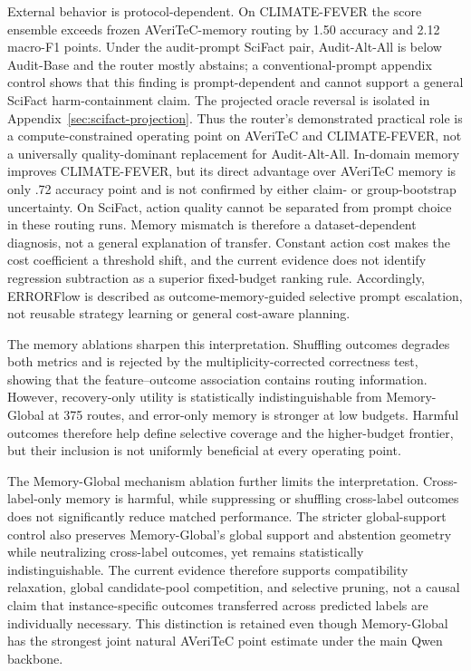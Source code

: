 \documentclass[runningheads]{llncs}
\begin{document}
External behavior is protocol-dependent. On CLIMATE-FEVER the score ensemble
exceeds frozen AVeriTeC-memory routing by 1.50 accuracy and 2.12 macro-F1
points. Under the audit-prompt SciFact pair, Audit-Alt-All is below Audit-Base and the
router mostly abstains; a conventional-prompt appendix control shows that
this finding is prompt-dependent and cannot support a general SciFact
harm-containment claim. The projected oracle
reversal is isolated in Appendix~\ref{sec:scifact-projection}. Thus the
router's demonstrated practical role is a compute-constrained operating point
on AVeriTeC and CLIMATE-FEVER, not a universally quality-dominant replacement
for Audit-Alt-All. In-domain memory improves
CLIMATE-FEVER, but its direct advantage over AVeriTeC memory is only .72
accuracy point and is not confirmed by either claim- or group-bootstrap
uncertainty. On SciFact, action quality cannot be separated from prompt choice
in these routing runs. Memory mismatch is therefore a
dataset-dependent diagnosis, not a general explanation of transfer.
Constant action cost makes the cost coefficient a threshold shift, and the
current evidence does not identify regression subtraction as a superior
fixed-budget ranking rule. Accordingly, ERRORFlow is described as
outcome-memory-guided selective prompt escalation, not reusable strategy
learning or general cost-aware planning.

The memory ablations sharpen this interpretation. Shuffling outcomes degrades
both metrics and is rejected by the multiplicity-corrected correctness test,
showing that the feature--outcome association contains routing information.
However, recovery-only utility is statistically indistinguishable from Memory-Global at
375 routes, and error-only memory is stronger at low budgets. Harmful outcomes
therefore help define selective coverage and the higher-budget frontier, but
their inclusion is not uniformly beneficial at every operating point.

The Memory-Global mechanism ablation further limits the interpretation. Cross-label-only
memory is harmful, while suppressing or shuffling cross-label outcomes does
not significantly reduce matched performance. The stricter global-support control also
preserves Memory-Global's global support and abstention geometry while neutralizing
cross-label outcomes, yet remains statistically indistinguishable. The
current evidence therefore supports compatibility relaxation, global
candidate-pool competition, and selective pruning, not a causal claim that
instance-specific outcomes transferred across predicted labels are
individually necessary. This distinction is retained even though Memory-Global has the
strongest joint natural AVeriTeC point estimate under the main Qwen backbone.
\end{document}
